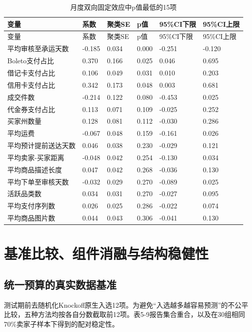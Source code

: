\documentclass{sufethesismas}
\begin{document}
\begin{longtable}[]{@{}llllll@{}}
\caption{月度双向固定效应中p值最低的15项}\tabularnewline
\toprule\noalign{}
变量 & 系数 & 聚类SE & p值 & 95\%CI下限 & 95\%CI上限 \\
\midrule\noalign{}
\endfirsthead
\toprule\noalign{}
变量 & 系数 & 聚类SE & p值 & 95\%CI下限 & 95\%CI上限 \\
\midrule\noalign{}
\endhead
\bottomrule\noalign{}
\endlastfoot
平均审核至承运天数 & -0.185 & 0.034 & 0.000 & -0.251 & -0.120 \\
Boleto支付占比 & 0.370 & 0.166 & 0.025 & 0.046 & 0.695 \\
借记卡支付占比 & 0.106 & 0.049 & 0.031 & 0.010 & 0.203 \\
信用卡支付占比 & 0.342 & 0.173 & 0.048 & 0.003 & 0.681 \\
成交件数 & -0.214 & 0.122 & 0.080 & -0.453 & 0.025 \\
代金券支付占比 & 0.113 & 0.071 & 0.109 & -0.025 & 0.252 \\
买家州数量 & 0.128 & 0.081 & 0.112 & -0.030 & 0.286 \\
平均运费 & -0.067 & 0.048 & 0.159 & -0.161 & 0.026 \\
平均预计提前送达天数 & 0.046 & 0.038 & 0.230 & -0.029 & 0.121 \\
平均卖家-买家距离 & -0.048 & 0.042 & 0.254 & -0.130 & 0.034 \\
平均商品描述长度 & 0.047 & 0.042 & 0.268 & -0.036 & 0.130 \\
平均下单至审核天数 & -0.032 & 0.029 & 0.270 & -0.089 & 0.025 \\
活跃品类数 & 0.034 & 0.031 & 0.270 & -0.027 & 0.095 \\
平均支付序列数 & 0.026 & 0.025 & 0.286 & -0.022 & 0.074 \\
平均商品图片数 & 0.044 & 0.043 & 0.306 & -0.041 & 0.130 \\
\end{longtable}

\section{基准比较、组件消融与结构稳健性}

\subsection{统一预算的真实数据基准}

测试期前去随机化Knockoff原生入选12项。为避免``入选越多越容易预测''的不公平比较，五种方法均按各自分数截取前12项。表5-9报告集合重合，以及在30组相同70\%卖家子样本下得到的配对稳定性。
\end{document}
